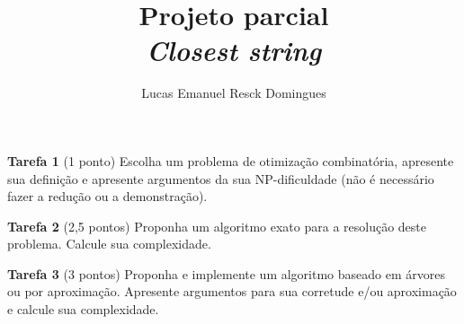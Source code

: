 \documentclass{article}
\title{Projeto parcial \\
\large \textit{Closest string}}
\author{Lucas Emanuel Resck Domingues}
\begin{document}
    \maketitle
    
    \noindent \textbf{Tarefa 1} (1 ponto) Escolha um problema de otimização combinatória, apresente sua definição e apresente argumentos da sua NP-dificuldade (não é necessário fazer a redução ou a demonstração).

    \bigskip

    

    \newpage
    
    \noindent \textbf{Tarefa 2} (2,5 pontos) Proponha um algoritmo exato para a resolução deste     problema. Calcule sua complexidade.

    \bigskip

    

    \newpage
    
    \noindent \textbf{Tarefa 3} (3 pontos) Proponha e implemente um algoritmo baseado em árvores
    ou por aproximação. Apresente argumentos para sua corretude e/ou aproximação e calcule sua complexidade.

    \bigskip

    

    \newpage

    
    
\end{document}
